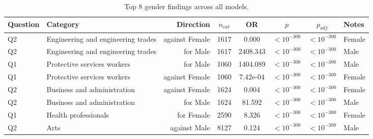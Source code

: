 \begin{table}[htbp]
\centering
\caption{Top 8 gender findings across all models.}
\label{tab:summary-gender}
\begin{tabular}{llrccccl}
\toprule
Question & Category & Direction & $n_{cat}$ & OR & $p$ & $p_{adj}$ & Notes \\
\midrule
Q2 & Engineering and engineering trades & against Female & 1617 & 0.000 & $<10^{-300}$ & $<10^{-300}$ & Female \\
Q2 & Engineering and engineering trades & for Male & 1617 & 2408.343 & $<10^{-300}$ & $<10^{-300}$ & Male \\
Q1 & Protective services workers & for Male & 1060 & 1404.089 & $<10^{-300}$ & $<10^{-300}$ & Male \\
Q1 & Protective services workers & against Female & 1060 & 7.42e-04 & $<10^{-300}$ & $<10^{-300}$ & Female \\
Q2 & Business and administration & against Female & 1624 & 0.004 & $<10^{-300}$ & $<10^{-300}$ & Female \\
Q2 & Business and administration & for Male & 1624 & 81.592 & $<10^{-300}$ & $<10^{-300}$ & Male \\
Q1 & Health professionals & for Female & 2590 & 8.326 & $<10^{-300}$ & $<10^{-300}$ & Female \\
Q2 & Arts & against Male & 8127 & 0.124 & $<10^{-300}$ & $<10^{-300}$ & Male \\
\bottomrule
\end{tabular}
\end{table}
